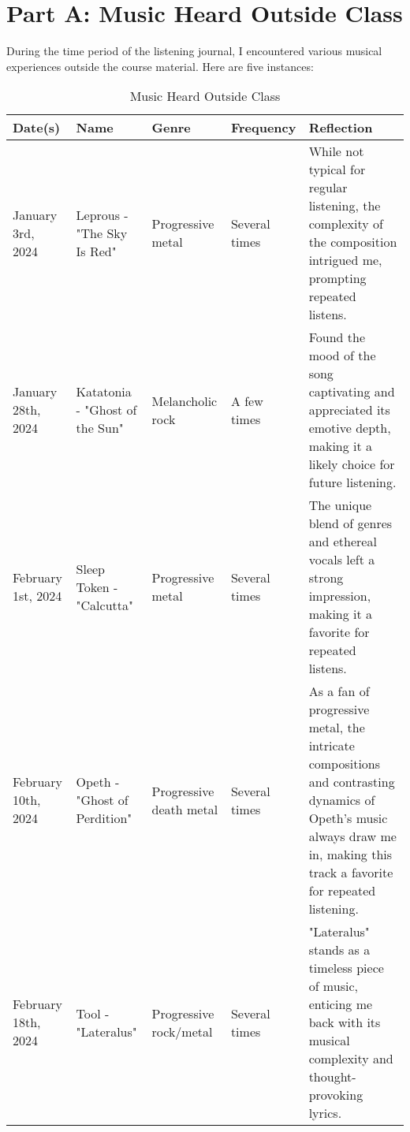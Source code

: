 
\section{Part A: Music Heard Outside Class}
\small
During the time period of the listening journal, I encountered various musical experiences outside the course material. Here are five instances:

{\setlength{\extrarowheight}{2pt}
\begin{table}[!htbp]
   \small
   \centering
   \begin{tabular}{@{}>{\raggedright\arraybackslash}p{2cm} >{\raggedright\arraybackslash}p{3.5cm} >{\raggedright\arraybackslash}p{3cm} >{\raggedright\arraybackslash}p{2cm} >{\raggedright\arraybackslash}p{4cm}@{}}
      \toprule
      \textbf{Date(s)}    & \textbf{Name}                  & \textbf{Genre}          & \textbf{Frequency} & \textbf{Reflection}                                                                                                                                                         \\
      \midrule
      January 3rd, 2024   & Leprous - "The Sky Is Red"     & Progressive metal       & Several times      & While not typical for regular listening, the complexity of the composition intrigued me, prompting repeated listens.                                                        \\
      \midrule
      January 28th, 2024  & Katatonia - "Ghost of the Sun" & Melancholic rock        & A few times        & Found the mood of the song captivating and appreciated its emotive depth, making it a likely choice for future listening.                                                   \\
      \midrule
      February 1st, 2024  & Sleep Token - "Calcutta"       & Progressive metal       & Several times      & The unique blend of genres and ethereal vocals left a strong impression, making it a favorite for repeated listens.                                                         \\
      \midrule
      February 10th, 2024 & Opeth - "Ghost of Perdition"   & Progressive death metal & Several times      & As a fan of progressive metal, the intricate compositions and contrasting dynamics of Opeth's music always draw me in, making this track a favorite for repeated listening. \\
      \midrule
      February 18th, 2024 & Tool - "Lateralus"             & Progressive rock/metal  & Several times      & "Lateralus" stands as a timeless piece of music, enticing me back with its musical complexity and thought-provoking lyrics.                                                 \\
      \bottomrule
   \end{tabular}
   \caption{Music Heard Outside Class}
\end{table}
}